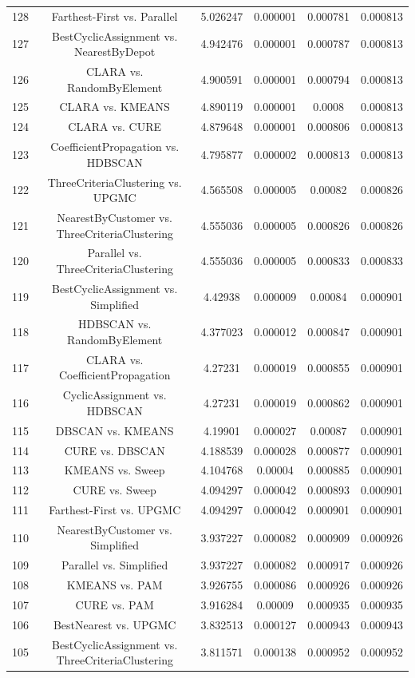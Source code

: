 \documentclass[a4paper,10pt]{article}
\begin{document}
\begin{landscape}
\begin{table}[!htp]
\begin{tabular}{cccccc}
128&Farthest-First vs. Parallel&5.026247&0.000001&0.000781&0.000813\\
127&BestCyclicAssignment vs. NearestByDepot&4.942476&0.000001&0.000787&0.000813\\
126&CLARA vs. RandomByElement&4.900591&0.000001&0.000794&0.000813\\
125&CLARA vs. KMEANS&4.890119&0.000001&0.0008&0.000813\\
124&CLARA vs. CURE&4.879648&0.000001&0.000806&0.000813\\
123&CoefficientPropagation vs. HDBSCAN&4.795877&0.000002&0.000813&0.000813\\
122&ThreeCriteriaClustering vs. UPGMC&4.565508&0.000005&0.00082&0.000826\\
121&NearestByCustomer vs. ThreeCriteriaClustering&4.555036&0.000005&0.000826&0.000826\\
120&Parallel vs. ThreeCriteriaClustering&4.555036&0.000005&0.000833&0.000833\\
119&BestCyclicAssignment vs. Simplified&4.42938&0.000009&0.00084&0.000901\\
118&HDBSCAN vs. RandomByElement&4.377023&0.000012&0.000847&0.000901\\
117&CLARA vs. CoefficientPropagation&4.27231&0.000019&0.000855&0.000901\\
116&CyclicAssignment vs. HDBSCAN&4.27231&0.000019&0.000862&0.000901\\
115&DBSCAN vs. KMEANS&4.19901&0.000027&0.00087&0.000901\\
114&CURE vs. DBSCAN&4.188539&0.000028&0.000877&0.000901\\
113&KMEANS vs. Sweep&4.104768&0.00004&0.000885&0.000901\\
112&CURE vs. Sweep&4.094297&0.000042&0.000893&0.000901\\
111&Farthest-First vs. UPGMC&4.094297&0.000042&0.000901&0.000901\\
110&NearestByCustomer vs. Simplified&3.937227&0.000082&0.000909&0.000926\\
109&Parallel vs. Simplified&3.937227&0.000082&0.000917&0.000926\\
108&KMEANS vs. PAM&3.926755&0.000086&0.000926&0.000926\\
107&CURE vs. PAM&3.916284&0.00009&0.000935&0.000935\\
106&BestNearest vs. UPGMC&3.832513&0.000127&0.000943&0.000943\\
105&BestCyclicAssignment vs. ThreeCriteriaClustering&3.811571&0.000138&0.000952&0.000952\\

\end{tabular}
\end{table}
\end{landscape}
\end{document}
